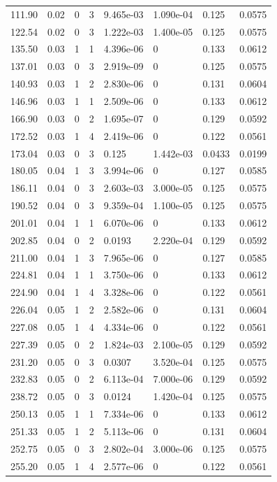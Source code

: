\documentclass[preview]{standalone}
\begin{document}
{{\begin{tabular}{L{1.2cm}C{1.2cm} C{0.3cm}C{0.5cm} C{1.4cm}C{1.4cm} C{1.4cm}C{1.4cm}}
  111.90  &  0.02  & 0     &  3 &  9.465e-03  & 1.090e-04  & 0.125 &  0.0575   \\ 
  122.54  &  0.02  & 0     &  3 &  1.222e-03  & 1.400e-05  & 0.125 &  0.0575   \\ 
  135.50  &  0.03  & 1     &  1 &  4.396e-06  & 0  & 0.133 &  0.0612   \\ 
  137.01  &  0.03  & 0     &  3 &  2.919e-09  & 0  & 0.125 &  0.0575   \\ 
  140.93  &  0.03  & 1     &  2 &  2.830e-06  & 0  & 0.131 &  0.0604   \\ 
  146.96  &  0.03  & 1     &  1 &  2.509e-06  & 0  & 0.133 &  0.0612   \\ 
  166.90  &  0.03  & 0     &  2 &  1.695e-07  & 0  & 0.129 &  0.0592   \\ 
  172.52  &  0.03  & 1     &  4 &  2.419e-06  & 0  & 0.122 &  0.0561   \\ 
  173.04  &  0.03  & 0     &  3 &  0.125  & 1.442e-03  & 0.0433 &  0.0199   \\ 
  180.05  &  0.04  & 1     &  3 &  3.994e-06  & 0  & 0.127 &  0.0585   \\ 
  186.11  &  0.04  & 0     &  3 &  2.603e-03  & 3.000e-05  & 0.125 &  0.0575   \\ 
  190.52  &  0.04  & 0     &  3 &  9.359e-04  & 1.100e-05  & 0.125 &  0.0575   \\ 
  201.01  &  0.04  & 1     &  1 &  6.070e-06  & 0  & 0.133 &  0.0612   \\ 
  202.85  &  0.04  & 0     &  2 &  0.0193  & 2.220e-04  & 0.129 &  0.0592   \\ 
  211.00  &  0.04  & 1     &  3 &  7.965e-06  & 0  & 0.127 &  0.0585   \\ 
  224.81  &  0.04  & 1     &  1 &  3.750e-06  & 0  & 0.133 &  0.0612   \\ 
  224.90  &  0.04  & 1     &  4 &  3.328e-06  & 0  & 0.122 &  0.0561   \\ 
  226.04  &  0.05  & 1     &  2 &  2.582e-06  & 0  & 0.131 &  0.0604   \\ 
  227.08  &  0.05  & 1     &  4 &  4.334e-06  & 0  & 0.122 &  0.0561   \\ 
  227.39  &  0.05  & 0     &  2 &  1.824e-03  & 2.100e-05  & 0.129 &  0.0592   \\ 
  231.20  &  0.05  & 0     &  3 &  0.0307  & 3.520e-04  & 0.125 &  0.0575   \\ 
  232.83  &  0.05  & 0     &  2 &  6.113e-04  & 7.000e-06  & 0.129 &  0.0592   \\ 
  238.72  &  0.05  & 0     &  3 &  0.0124  & 1.420e-04  & 0.125 &  0.0575   \\ 
  250.13  &  0.05  & 1     &  1 &  7.334e-06  & 0  & 0.133 &  0.0612   \\ 
  251.33  &  0.05  & 1     &  2 &  5.113e-06  & 0  & 0.131 &  0.0604   \\ 
  252.75  &  0.05  & 0     &  3 &  2.802e-04  & 3.000e-06  & 0.125 &  0.0575   \\ 
  255.20  &  0.05  & 1     &  4 &  2.577e-06  & 0  & 0.122 &  0.0561   \\ 
\hline 
\end{tabular} 

}}
\end{document}
